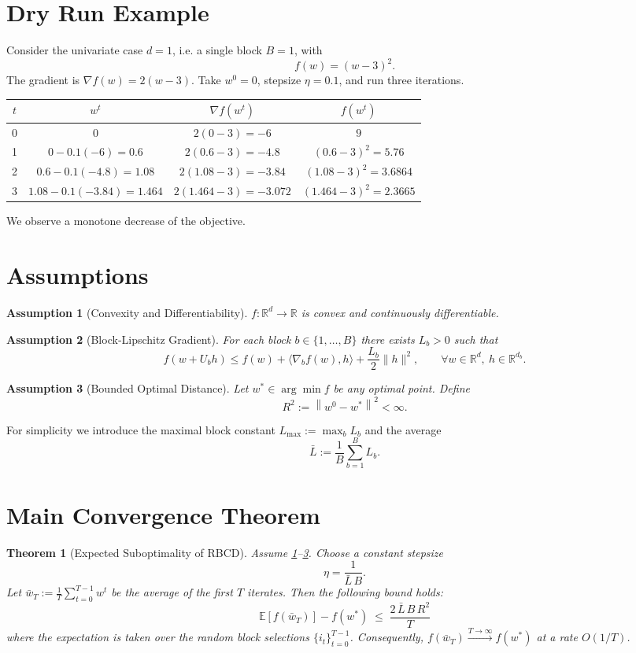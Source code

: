 \documentclass{article}
\newtheorem{theorem}{Theorem}
\newtheorem{assumption}{Assumption}
\newcommand{\E}{\mathbb{E}}
\newcommand{\norm}[1]{\left\lVert#1\right\rVert}
\begin{document}
\section*{Dry Run Example}
Consider the univariate case $d=1$, i.e. a single block $B=1$, with
\[
f(w)=(w-3)^{2}.
\]
The gradient is $\nabla f(w)=2(w-3)$.  
Take $w^{0}=0$, stepsize $\eta=0.1$, and run three iterations.

\begin{center}
\begin{tabular}{c|c|c|c}
$t$ & $w^{t}$ & $\nabla f(w^{t})$ & $f(w^{t})$\\ \hline
0 & $0$ & $2(0-3)=-6$ & $9$\\
1 & $0-0.1(-6)=0.6$ & $2(0.6-3)=-4.8$ & $(0.6-3)^{2}=5.76$\\
2 & $0.6-0.1(-4.8)=1.08$ & $2(1.08-3)=-3.84$ & $(1.08-3)^{2}=3.6864$\\
3 & $1.08-0.1(-3.84)=1.464$ & $2(1.464-3)=-3.072$ & $(1.464-3)^{2}=2.3665$\\
\end{tabular}
\end{center}
We observe a monotone decrease of the objective.

\newpage
\section*{Assumptions}
\begin{assumption}[Convexity and Differentiability]\label{as:convex}
$f:\mathbb{R}^{d}\rightarrow\mathbb{R}$ is convex and continuously differentiable.
\end{assumption}
\begin{assumption}[Block‑Lipschitz Gradient]\label{as:lipschitz}
For each block $b\in\{1,\dots ,B\}$ there exists $L_{b}>0$ such that
\[
f(w+U_{b}h)\le f(w)+\langle\nabla_{b}f(w),h\rangle+\frac{L_{b}}{2}\|h\|^{2},
\qquad\forall w\in\mathbb{R}^{d},~h\in\mathbb{R}^{d_{b}} .
\tag{2}
\]
\end{assumption}
\begin{assumption}[Bounded Optimal Distance]\label{as:bounded}
Let $w^{*}\in\arg\min f$ be any optimal point. Define
\[
R^{2}:=\norm{w^{0}-w^{*}}^{2}<\infty .
\]
\end{assumption}
For simplicity we introduce the maximal block constant $L_{\max}:=\max_{b}L_{b}$ and the average
\[
\bar L:=\frac{1}{B}\sum_{b=1}^{B}L_{b}.
\]

\section*{Main Convergence Theorem}
\begin{theorem}[Expected Suboptimality of RBCD]\label{thm:main}
Assume \ref{as:convex}–\ref{as:bounded}. Choose a constant stepsize
\[
\eta=\frac{1}{\bar L\,B}.
\tag{3}
\]
Let $\bar w_{T}:=\frac{1}{T}\sum_{t=0}^{T-1}w^{t}$ be the average of the first $T$ iterates.
Then the following bound holds:
\[
\boxed{
\E\!\left[f(\bar w_{T})\right]-f(w^{*})
\;\le\;
\frac{2\,\bar L\,B\,R^{2}}{T}
}
\tag{4}
\]
where the expectation is taken over the random block selections $\{i_{t}\}_{t=0}^{T-1}$.
Consequently, $f(\bar w_{T})\xrightarrow{T\to\infty}f(w^{*})$ at a rate $O(1/T)$.
\end{theorem}
\end{document}
